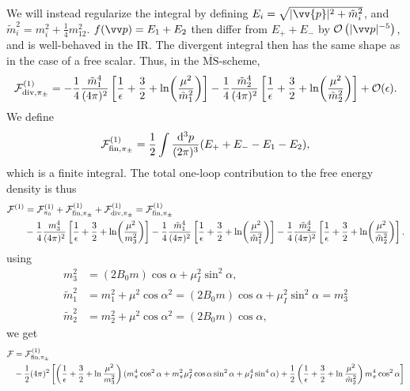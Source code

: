 We will instead regularize the integral by defining $E_i = \sqrt{|\vv{p}|^2 + \tilde m_i^2}$, and $\tilde m_i^2 = m_i^2 + \frac{1}{4} m_{12}^2$.
$f(\vv p) = E_1 + E_2$ then differ from $E_+ + E_-$ by $\Oh[-5]{|\vv p|}$, and is well-behaved in the IR.
The divergent integral then has the same shape as in the case of a free scalar.
Thus, in the $\mathrm{\overline{MS}}$-scheme, 
\begin{equation}
    \mathcal{F}^{(1)}_{\mathrm{div}, \pi_\pm }
    =
    - \frac{1}{4} \frac{\tilde m_1^4}{(4\pi)^2} 
    \left[
        \frac{1}{\epsilon} + \frac{3}{2} + \ln(\frac{\mu^2}{\tilde m_1^2}) 
    \right] 
    - \frac{1}{4} \frac{\tilde m_2^4}{(4\pi)^2} 
    \left[
        \frac{1}{\epsilon} + \frac{3}{2} + \ln(\frac{\mu^2}{\tilde m_2^2})
    \right] 
    + \mathcal{O}(\epsilon).
\end{equation}
We define
\begin{equation}
    \mathcal{F}^{(1)}_{\mathrm{fin}, \pi_\pm}
    = 
    \frac{1}{2} \int \frac{\dd^3 p}{(2\pi)^3} (E_+ + E_- - E_1 - E_2),
\end{equation}
which is a finite integral.
The total one-loop contribution to the free energy density is thus
\begin{align}
    \mathcal{F}^{(1)}
    & = 
    \mathcal{F}^{(1)}_{\pi_0} 
    + \mathcal{F}^{(1)}_{\mathrm{fin}, \pi_\pm}
    + \mathcal{F}^{(1)}_{\mathrm{div}, \pi_\pm}
    = 
    \mathcal{F}^{(1)}_{\mathrm{fin}, \pi_\pm}
    \\
    & - \frac{1}{4} \frac{m_3^4}{(4\pi)^2} 
    \left[ \frac{1}{\epsilon} + \frac{3}{2} + \ln(\frac{\mu^2}{m_3^2}) \right]
    - \frac{1}{4} \frac{\tilde m_1^4}{(4\pi)^2} 
    \left[
        \frac{1}{\epsilon} + \frac{3}{2} + \ln(\frac{\mu^2}{\tilde m_1^2}) 
    \right] 
    - \frac{1}{4} \frac{\tilde m_2^4}{(4\pi)^2} 
    \left[
        \frac{1}{\epsilon} + \frac{3}{2} + \ln(\frac{\mu^2}{\tilde m_2^2})
    \right].
\end{align}
using
\begin{align}
    m_3^2 & = (2 B_0 m) \cos \alpha + \mu_ I^2 \sin^2 \alpha, \\
    \tilde m_1^2 
    & 
    = m_1^2 + \mu^2 \cos\alpha^2
    = (2 B_0 m) \cos \alpha + \mu_I^2 \sin^2 \alpha
    = m_3^2 \\
    \tilde m_2^2 
    & = m_2^2 + \mu^2 \cos\alpha^2
    = (2 B_0 m) \cos \alpha, 
\end{align}
we get
\begin{align}
    \Ef
    & = 
    \Ef^{(1)}_{\mathrm{fin}, \pi_\pm} \\
    & - \frac{1}{2}{(4\pi)^2} 
    \left[
        \left( \frac{1}{\epsilon} + \frac{3}{2} + \ln \frac{\mu^2}{m_3^2 } \right)
        (m_\pi^4 \cos^2 \alpha + m_\pi^2\mu_I^2 \cos\alpha \sin^2\alpha + \mu_I^4 \sin^4\alpha)
        +
        \frac{1}{2}
        \left( \frac{1}{\epsilon} + \frac{3}{2} + \ln \frac{\mu^2}{\tilde m_2^2} \right)
        m_\pi^4 \cos^2\alpha
    \right]
\end{align}
